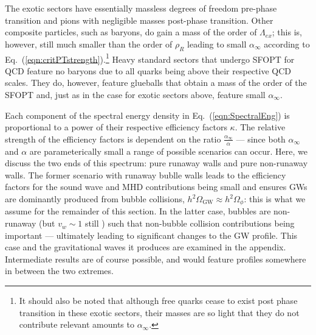 \documentclass[nofootinbib,twocolumn,preprintnumbers]{revtex4-1}
\begin{document}
The exotic sectors have essentially massless degrees of freedom pre-phase transition and pions with negligible masses post-phase transition. Other composite particles, such as baryons, do gain a mass of the order of $\Lambda_{ex}$; this is, however, still much smaller than the order of $\rho_R$ leading to small $\alpha_{\infty}$ according to Eq.~(\ref{eqn:critPTstrength}).\footnote {It should also be noted that although free quarks cease to exist post phase transition in these exotic sectors, their masses are so light that they do not contribute relevant amounts to $\alpha_{\infty}$.} Heavy standard sectors that undergo SFOPT for QCD feature no baryons due to all quarks being above their respective QCD scales. They do, however, feature glueballs that obtain a mass of the order of the SFOPT and, just as in the case for exotic sectors above, feature small $\alpha_{\infty}$. 
 
Each component of the spectral energy density in Eq.~(\ref{eqn:SpectralEng}) is proportional to a power of their respective efficiency factors $\kappa$. The relative strength of the efficiency factors is dependent on the ratio $\frac{\alpha_{\infty}}{\alpha}$ --- since both $\alpha_{\infty}$ and $\alpha$ are parameterically small \cite{Bai:2018dxf,Helmboldt:2019pan} a range of possible scenarios can occur. Here, we discuss the two ends of this spectrum: pure runaway walls and pure non-runaway walls. The former scenario with runaway bublle walls leads to the efficiency factors for the sound wave and MHD contributions being small and ensures GWs are dominantly produced from bubble collisions, $h^2\Omega_{\textrm{GW}} \approx h^2\Omega_{\phi}$: this is what we assume for the remainder of this section. In the latter case, bubbles are non-runaway (but $v_w \sim 1$ still \cite{Breitbach:2018ddu,Bodeker2017}) such that non-bubble collision contributions being important --- ultimately leading to significant changes to the GW profile. This case and the gravitational waves it produces are examined in the appendix. Intermediate results are of course possible, and would feature profiles somewhere in between the two extremes.
\end{document}
